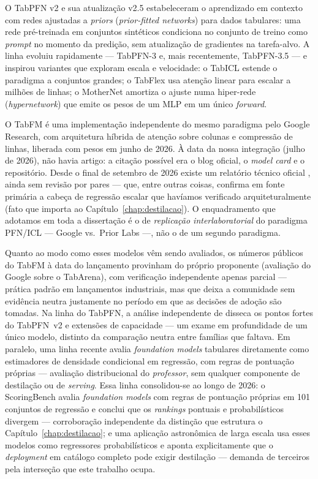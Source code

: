 O TabPFN v2 \citep{hollmann2025} e sua
atualização v2.5 \citep{priorlabs2025} estabeleceram o aprendizado em
contexto com redes ajustadas a \emph{priors} (\emph{prior-fitted networks})
para dados tabulares: uma rede pré-treinada em conjuntos sintéticos
condiciona no conjunto de treino como \emph{prompt} no momento da predição,
sem atualização de gradientes na tarefa-alvo. A linha evoluiu rapidamente
--- TabPFN-3 \citep{tabpfn3-2026} e, mais recentemente, TabPFN-3.5
\citep{tabpfn35tr2026} --- e
inspirou variantes que exploram escala e velocidade: o TabICL
\citep{tabicl2025} estende o paradigma a conjuntos grandes; o TabFlex
\citep{tabflex2025} usa atenção linear para escalar a milhões de linhas; o
MotherNet \citep{mothernet2023} amortiza o ajuste numa hiper-rede
(\emph{hypernetwork}) que emite os pesos de um MLP em um único
\emph{forward}.

O TabFM \citep{tabfm2026} é uma implementação
independente do mesmo paradigma pelo Google Research, com arquitetura
híbrida de atenção sobre colunas e compressão de linhas, liberada com pesos
em junho de 2026. À data da nossa integração (julho de 2026), não havia
artigo: a citação possível era o blog oficial, o \emph{model card} e o
repositório. Desde o final de setembro de 2026 existe um relatório técnico
oficial \citep{kong2026}, ainda sem revisão por pares --- que, entre outras
coisas, confirma em fonte primária a cabeça de regressão escalar que
havíamos verificado arquiteturalmente (fato que importa ao
Capítulo~\ref{chap:destilacao}). O enquadramento que adotamos em
toda a dissertação é o de \emph{replicação interlaboratorial} do
paradigma PFN/ICL --- Google vs.\ Prior Labs ---, não o de um segundo
paradigma.

Quanto ao modo como esses modelos vêm sendo avaliados, os números públicos do
TabFM à data do lançamento provinham do próprio proponente (avaliação do
Google sobre o TabArena), com verificação independente apenas parcial ---
prática padrão em lançamentos industriais, mas que deixa a comunidade sem
evidência neutra justamente no período em que as decisões de adoção são
tomadas. Na linha do TabPFN, a análise independente de
\citet{ye2025tabpfnv2} disseca os pontos fortes do TabPFN~v2 e
extensões de capacidade --- um exame em profundidade de um único
modelo, distinto
da comparação neutra entre famílias que faltava. Em paralelo, uma linha recente avalia \emph{foundation models}
tabulares diretamente como estimadores de densidade condicional em
regressão, com regras de pontuação próprias
\citep{izbicki2026,landsgesell2026} --- avaliação distribucional do
\emph{professor}, sem qualquer componente de destilação ou de \emph{serving}.
Essa linha consolidou-se ao longo de 2026: o ScoringBench
\citep{scoringbench2026} avalia \emph{foundation models} com regras de
pontuação próprias em 101 conjuntos de regressão e conclui que os
\emph{rankings} pontuais e probabilísticos divergem --- corroboração
independente da distinção que estrutura o Capítulo~\ref{chap:destilacao};
e uma aplicação astronômica de larga escala \citep{photoz2026} usa esses
modelos como regressores probabilísticos e aponta explicitamente que o
\emph{deployment} em catálogo completo pode exigir destilação ---
demanda de terceiros pela interseção que este trabalho ocupa.

